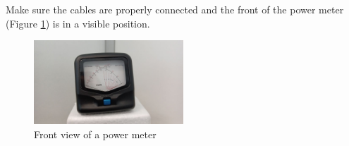 \documentclass[11pt,a4paper]{article}
\begin{document}
Make sure the cables are properly connected and the front of the power meter (Figure \ref{fig:frontview1})
is in a visible position.

\begin{figure}[!ht]
  \centering
  \includegraphics[width=0.5\textwidth]{pictures/wattmeter_5.jpeg}
  \caption{Front view of a power meter}
  \label{fig:frontview1}
\end{figure}
\end{document}
